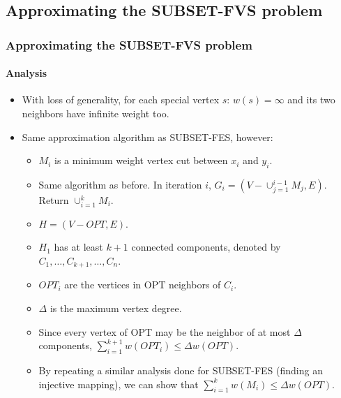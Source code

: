 \documentclass[10pt]{beamer}
\begin{document}
\subsection{Approximating the SUBSET-FVS problem}
\begin{frame}
    \frametitle{Approximating the SUBSET-FVS problem}
    \framesubtitle{Analysis}
    \begin{itemize}
        \item With loss of generality, for each special vertex \(s\): \(w(s) = \infty\) and its two neighbors have infinite weight too.
        \item Same approximation algorithm as SUBSET-FES, however:
        \begin{itemize}
            \item \(M_i\) is a minimum weight vertex cut between \(x_i\) and \(y_i\).
            \item Same algorithm as before. In iteration \(i\), \(G_i = (V - \cup_{j=1}^{i-1}M_j, E)\). Return \(\cup_{i=1}^k M_i\).
            \item \(H= (V-OPT, E)\).
            \item \(H_1\) has at least \(k+1\) connected components, denoted by \(C_1, \ldots, C_{k+1}, \ldots, C_n\).
            \item \(OPT_i\) are the vertices in OPT neighbors of \(C_i\).
            \item \(\Delta\) is the maximum vertex degree.
            \item Since every vertex of OPT may be the neighbor of at most \(\Delta\) components, \(\sum_{i=1}^{k+1} w(OPT_i) \leq \Delta w(OPT)\).
            \item By repeating a similar analysis done for SUBSET-FES (finding an injective mapping), we can show that \(\sum_{i=1}^{k} w(M_i) \leq \Delta w(OPT)\).
        \end{itemize}
    \end{itemize}
\end{frame}
\end{document}
